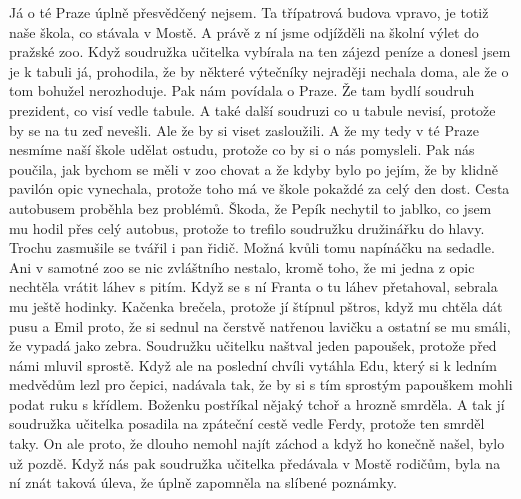 
Já o té Praze úplně přesvědčený nejsem. Ta třípatrová budova vpravo,
je totiž naše škola, co stávala v Mostě. A právě z ní jsme odjížděli
na školní výlet do pražské zoo. Když soudružka učitelka vybírala na
ten zájezd peníze a donesl jsem je k tabuli já, prohodila, že by
některé výtečníky nejraději nechala doma, ale že o tom bohužel
nerozhoduje. Pak nám povídala o Praze. Že tam bydlí soudruh prezident,
co visí vedle tabule. A také další soudruzi co u tabule nevisí,
protože by se na tu zeď nevešli. Ale že by si viset zasloužili. A že
my tedy v té Praze nesmíme naší škole udělat ostudu, protože co by si
o nás pomysleli. Pak nás poučila, jak bychom se měli v zoo chovat a že
kdyby bylo po jejím, že by klidně pavilón opic vynechala, protože toho
má ve škole pokaždé za celý den dost. Cesta autobusem proběhla bez
problémů. Škoda, že Pepík nechytil to jablko, co jsem mu hodil přes
celý autobus, protože to trefilo soudružku družinářku do hlavy. Trochu
zasmušile se tvářil i pan řidič. Možná kvůli tomu napínáčku na
sedadle. Ani v samotné zoo se nic zvláštního nestalo, kromě toho, že
mi jedna z opic nechtěla vrátit láhev s pitím. Když se s ní Franta o
tu láhev přetahoval, sebrala mu ještě hodinky. Kačenka brečela,
protože jí štípnul pštros, když mu chtěla dát pusu a Emil proto, že si
sednul na čerstvě natřenou lavičku a ostatní se mu smáli, že vypadá
jako zebra. Soudružku učitelku naštval jeden papoušek, protože před
námi mluvil sprostě. Když ale na poslední chvíli vytáhla Edu, který si
k ledním medvědům lezl pro čepici, nadávala tak, že by si s tím
sprostým papouškem mohli podat ruku s křídlem. Boženku postříkal
nějaký tchoř a hrozně smrděla. A tak jí soudružka učitelka posadila na
zpáteční cestě vedle Ferdy, protože ten smrděl taky. On ale proto, že
dlouho nemohl najít záchod a když ho konečně našel, bylo už pozdě.
Když nás pak soudružka učitelka předávala v Mostě rodičům, byla na ní
znát taková úleva, že úplně zapomněla na slíbené poznámky.

